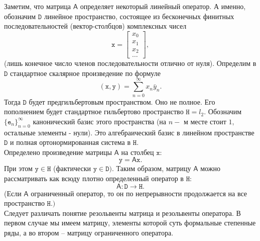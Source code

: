 \documentclass[12pt,a4paper]{article}
\theoremstyle{plain}   \newtheorem{Pro}{Задача}
\begin{document}
Заметим, что матрица
$ \mathsf{A} $
определяет некоторый линейный оператор. А именно, обозначим
$ \mathtt{D} $
линейное пространство, состоящее из бесконечных финитных
последовательностей (вектор-столбцов) комплексных чисел
\begin{equation*}
  \mathtt{x}=
  \begin{bmatrix}
   x_0 \\
   x_1 \\
   x_2 \\
   \dots
 \end{bmatrix}
 ,
\end{equation*}
(лишь конечное число членов последовательности отлично
от нуля). Определим в
$ \mathtt{D} $
стандартное скалярное произведение по формуле
$$
  (\mathtt{x},\mathtt{y})=\sum _{n=0}^{\infty} x_n \bar y_n .
$$
Тогда
$ \mathtt{D} $
будет предгильбертовым пространством. Оно не полное. Его
пополнением будет стандартное гильбертово пространство
$ \mathtt{H} = l_2 . $
Обозначим
$ \{ \mathtt{e}_n \} _{n=0}^{\infty} $
канонический базис этого пространства
(на $ n- $ м месте стоит $ 1 ,$ остальные элементы - нули).
Это алгебраический базис в линейном пространстве
$ \mathtt{D} $
и полная ортонормированная система в
$ \mathtt{H} . $
\\
Определено произведение матрицы
$ \mathsf{A} $
на столбец
$ \mathtt{x} : $
$$
  \mathtt{y} = \mathsf{A} \mathtt{x} .
$$
При этом
$ \mathtt{y} \in \mathtt{H} $
(фактически
$ \mathtt{y} \in \mathtt{D} ). $
Таким образом, матрицу
$ \mathsf{A} $
можно рассматривать как всюду плотно определенный оператор в
$ \mathtt{H} : $
$$
  \mathsf{A} : \mathtt{D} \longrightarrow \mathtt{H}.
$$
(Если
$ \mathsf{A} $
ограниченный оператор, то он по непрерывности продолжается на все
пространство
$ \mathtt{H} . ) $
\\
Следует различать понятие резольвенты матрица и резольвенты
оператора. В первом случае мы имеем матрицу, элементы которой суть
формальные степенные ряды, а во втором -- матрицу ограниченного
оператора.
\\
\end{document}
